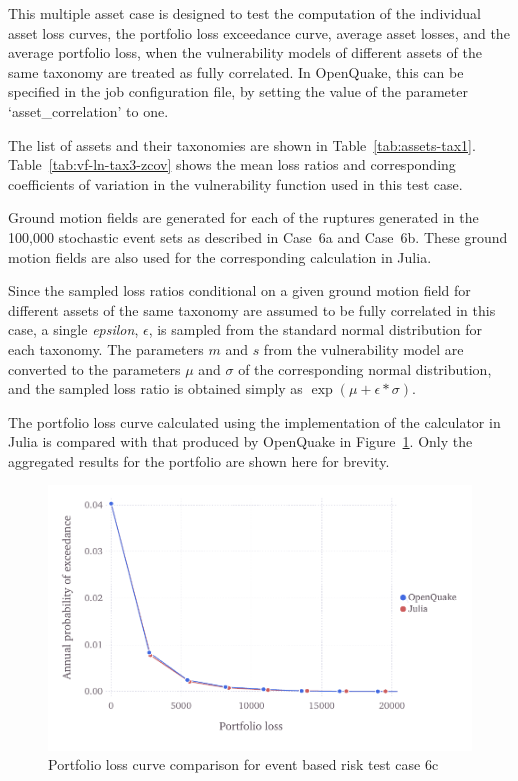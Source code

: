 This multiple asset case is designed to test the computation of the individual asset loss curves, the portfolio loss exceedance curve, average asset losses, and the average portfolio loss, when the vulnerability models of different assets of the same taxonomy are treated as fully correlated. In OpenQuake, this can be specified in the job configuration file, by setting the value of the parameter `asset\_correlation' to one.

The list of assets and their taxonomies are shown in Table~\ref{tab:assets-tax1}. Table~\ref{tab:vf-ln-tax3-zcov} shows the mean loss ratios and corresponding coefficients of variation in the vulnerability function used in this test case.

Ground motion fields are generated for each of the ruptures generated in the 100,000 stochastic event sets as described in Case~6a and Case~6b. These ground motion fields are also used for the corresponding calculation in Julia.

Since the sampled loss ratios conditional on a given ground motion field for different assets of the same taxonomy are assumed to be fully correlated in this case, a single \emph{epsilon}, $\epsilon$,  is sampled from the standard normal distribution for each taxonomy. The parameters $m$ and $s$ from the vulnerability model are converted to the parameters $\mu$ and $\sigma$ of the corresponding normal distribution, and the sampled loss ratio is obtained simply as $\exp (\mu + \epsilon * \sigma)$.

The portfolio loss curve calculated using the implementation of the calculator in Julia is compared with that produced by OpenQuake in Figure~\ref{fig:lc-ebr-6c}. Only the aggregated results for the portfolio are shown here for brevity.

\begin{figure}[htbp]
\centering
\includegraphics[width=12cm]{qareport/figures/fig-lc-ebr-6c}
\caption{Portfolio loss curve comparison for event based risk test case 6c}
\label{fig:lc-ebr-6c}
\end{figure}